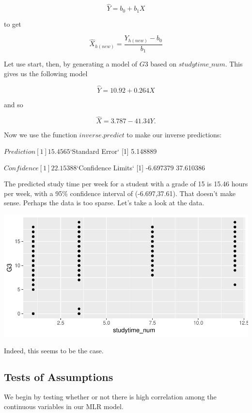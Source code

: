 \documentclass{article}
\begin{document}
$$\hat{Y}=b_{0} + b_{1}X$$

to get 

$$\hat{X}_{h(new)} = \frac{Y_{h(new)}-b_{0}}{b_{1}}$$


Let use start, then, by generating a model of $G3$ based on $studytime\_num$. This gives us the following model

$$\hat{Y}=10.92+0.264X$$

and so 

$$\hat{X}=3.787-41.34Y.$$

Now we use the function $inverse.predict$ to make our inverse predictions:

\begin{Schunk}
\begin{Soutput}
$Prediction
[1] 15.4565

$`Standard Error`
[1] 5.148889

$Confidence
[1] 22.15388

$`Confidence Limits`
[1] -6.697379 37.610386
\end{Soutput}
\end{Schunk}

The predicted study time per week for a student with a grade of 15 is 15.46 hours per week, with a 95\% confidence interval of (-6.697,37.61). That doesn't make sense. Perhaps the data is too sparse. Let's take a look at the data.

\includegraphics{Report_4-017}

Indeed, this seems to be the case.


\subsection{Tests of Assumptions}


We begin by testing whether or not there is high correlation among the continuous variables in our MLR model.
\end{document}
